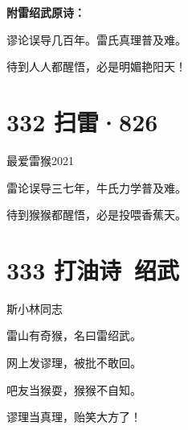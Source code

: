 \documentclass[UTF8,12pt,oneside]{ctexbook}
\def\pau#1{\begin{center} {#1} \end{center}} %
\def\poem#1#2{\section{#1}\pau{#2}} %
\begin{document}
        \noindent \textbf{附雷绍武原诗：}
        \begin{center}
            谬论误导几百年。雷氏真理普及难。
            
            待到人人都醒悟，必是明媚艳阳天！
        \end{center} 

        \poem{332 扫雷·826}{最爱雷猴2021}
        \begin{center}
            雷论误导三七年，牛氏力学普及难。

            待到猴猴都醒悟，必是投喂香蕉天。
        \end{center}

        \poem{333 打油诗\ 绍武}{斯小林同志}
        \begin{center}
            雷山有奇猴，名曰雷绍武。

            网上发谬理，被批不敢回。
            
            吧友当猴耍，猴猴不自知。
            
            谬理当真理，贻笑大方了！
        \end{center}
\end{document}
